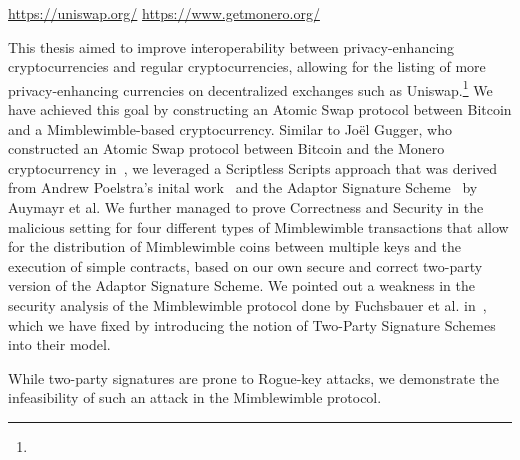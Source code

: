 \urldef{\urluniswp}\url{https://uniswap.org/}
\urldef{\urlmonero}\url{https://www.getmonero.org/}

This thesis aimed to improve interoperability between privacy-enhancing cryptocurrencies and regular cryptocurrencies, allowing for the listing of more privacy-enhancing currencies on decentralized exchanges such as Uniswap.\footnote{\urluniswp}
We have achieved this goal by constructing an Atomic Swap protocol between Bitcoin and a Mimblewimble-based cryptocurrency.
Similar to Joël Gugger, who constructed an Atomic Swap protocol between Bitcoin and the Monero cryptocurrency in~\cite{gugger2020bitcoin}, we leveraged a Scriptless Scripts approach that was derived from Andrew Poelstra's inital work~\cite{poelstra2017scriptless} and the Adaptor Signature Scheme~\cite{aumayr2020bitcoinchannels} by Auymayr et al.
We further managed to prove Correctness and Security in the malicious setting for four different types of Mimblewimble transactions that allow for the distribution of Mimblewimble coins between multiple keys and the execution of simple contracts, based on our own secure and correct two-party version of the Adaptor Signature Scheme.
We pointed out a weakness in the security analysis of the Mimblewimble protocol done by Fuchsbauer et al. in~\cite{fuchsbauer2019aggregate}, which we have fixed by introducing the notion of Two-Party Signature Schemes into their model.

While two-party signatures are prone to Rogue-key attacks, we demonstrate the infeasibility of such an attack in the Mimblewimble protocol.

